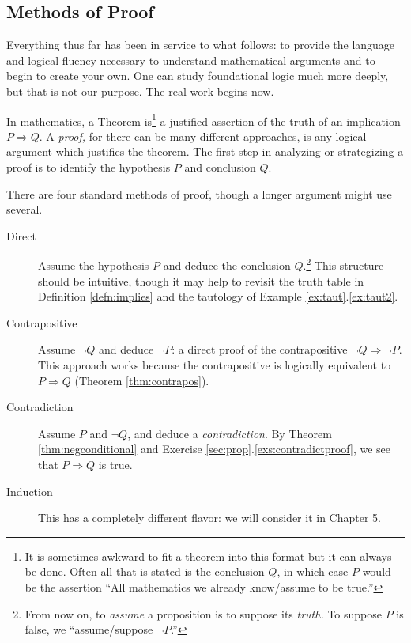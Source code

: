 \clearpage



\subsection{Methods of Proof}\label{sec:proof}

Everything thus far has been in service to what follows: to provide the language and logical fluency necessary to understand mathematical arguments and to begin to create your own. One can study foundational logic much more deeply, but that is not our purpose. The real work begins now.\medbreak

In mathematics, a Theorem is\footnote{It is sometimes awkward to fit a theorem into this format but it can always be done. Often all that is stated is the conclusion $Q$, in which case $P$ would be the assertion ``All mathematics we already know/assume to be true.''} a justified assertion of the truth of an implication $P\Longrightarrow Q$. A \emph{proof,} for there can be many different approaches, is any logical argument which justifies the theorem. The first step in analyzing or strategizing a proof is to identify the hypothesis $P$ and conclusion $Q$.\medbreak 

There are four standard methods of proof, though a longer argument might use several.
\begin{description}
	\item[Direct] Assume the hypothesis $P$ and deduce the conclusion $Q$.\footnote{From now on, to \emph{assume} a proposition is to suppose its \emph{truth.} To suppose $P$ is false, we ``assume/suppose $\neg P$.''} This structure should be intuitive, though it may help to revisit the truth table in Definition \ref{defn:implies} and the tautology of Example \ref*{ex:taut}.\ref{ex:taut2}.
	\item[Contrapositive] Assume $\neg Q$ and deduce $\neg P$: a direct proof of the contrapositive $\neg Q\Longrightarrow\neg P$. This approach works because the contrapositive is logically equivalent to $P\Longrightarrow Q$ (Theorem \ref{thm:contrapos}).
	\item[Contradiction] Assume $P$ and $\neg Q$, and deduce a \emph{contradiction}. By Theorem \ref{thm:negconditional} and Exercise \ref*{sec:prop}.\ref{exs:contradictproof}, we see that $P\Longrightarrow Q$ is true.
	\item[Induction] This has a completely different flavor: we will consider it in Chapter 5.
\end{description}

